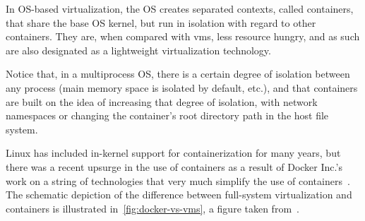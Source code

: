 In OS-based virtualization, the OS creates separated contexts, called containers, that share the base OS kernel, but run in isolation with regard to other containers.
They are, when compared with \glspl{vm}, less resource hungry, and as such are also designated as a lightweight virtualization technology.

Notice that, in a multiprocess OS, there is a certain degree of isolation between any process (main memory space is isolated by default, etc.), and that containers are built on the idea of increasing that degree of isolation, with network namespaces or changing the container's root directory path in the host file system.

Linux has included in-kernel support for containerization for many years, but there was a recent upsurge in the use of containers as a result of Docker Inc.'s work on a string of technologies that very much simplify the use of containers~\cite{hwswvirt,virtessentials}.
The schematic depiction of the difference between full-system virtualization and containers is illustrated in~\ref{fig:docker-vs-vms}, a figure taken from~\cite{dockercontreplacingvms}.




